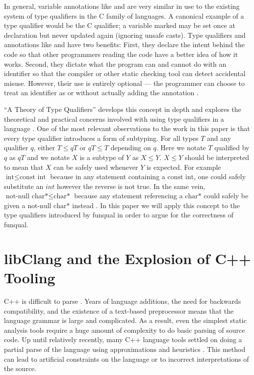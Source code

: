 In general, variable annotations like  and  are very similar in use to the existing system of type qualifiers in the C family of languages.  A canonical example of a type qualifier would be the C  qualifier; a variable marked  may be set once at declaration but never updated again (ignoring unsafe casts).  Type qualifiers and annotations like  and  have two benefits:  First, they declare the intent behind the code so that other programmers reading the code have a better idea of how it works.  Second, they dictate what the program can and cannot do with an identifier so that the compiler or other static checking tool can detect accidental misuse.  However, their use is entirely optional --- the programmer can choose to treat an identifier as  or  without actually adding the annotation \cite{theory-of-qual}.

``A Theory of Type Qualifiers'' develops this concept in depth and explores the theoretical and practical concerns involved with using type qualifiers in a language \cite{theory-of-qual}.  One of the most relevant observations to the work in this paper is that every type qualifier introduces a form of subtyping.  For all types $T$ and any qualifier $q$, either $T \leq q T$ or $q T \leq T$ depending on $q$.  Here we notate $T$ qualified by $q$ as $q T$ and we notate $X$ is a subtype of $Y$ as $X \leq Y$.  $X \leq Y$ should be interpreted to mean that $X$ can be safely used whenever $Y$ is expected.  For example $\textrm{int} \leq \textrm{const int}$ because in any statement containing a $\textrm{const int}$, one could safely substitute an $int$ however the reverse is not true.  In the same vein, $\textrm{not-null char*} \leq \textrm{char*}$ because any statement referencing a $\textrm{char*}$ could safely be given a $\textrm{not-null char*}$ instead \cite{theory-of-qual}.  In this paper we will apply this concept to the type qualifiers introduced by funqual in order to argue for the correctness of funqual.  

\section{libClang and the Explosion of C++ Tooling}\label{sec:related:libclang}

C++ is difficult to parse \cite{cpp-sucks, libclang-survey, mozilla-pork, parse-cpp}.  Years of language additions, the need for backwards compatibility, and the existence of a text-based preprocessor means that the language grammar is large and complicated.  As a result, even the simplest static analysis tools require a huge amount of complexity to do basic parsing of source code.  Up until relatively recently, many C++ language tools settled on doing a partial parse of the language using approximations and heuristics \cite{libclang-survey}.  This method can lead to artificial constraints on the language or to incorrect interpretations of the source.  

